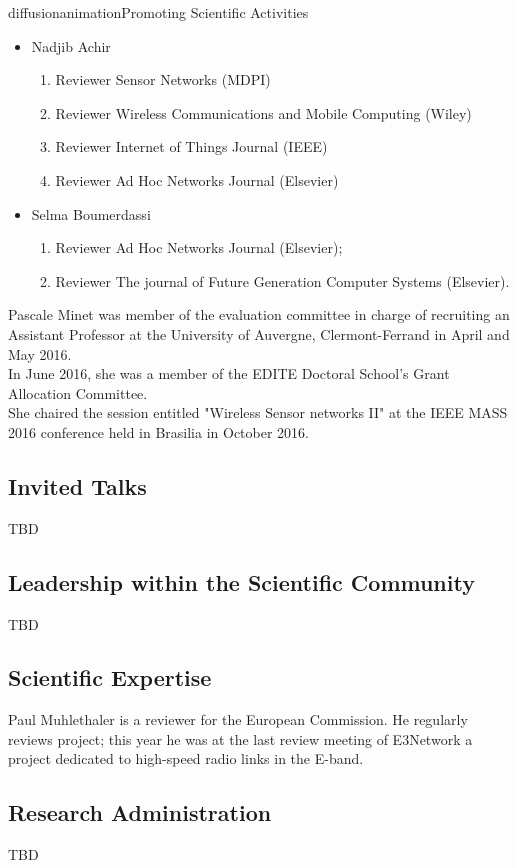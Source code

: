 \documentclass{ra2016}
\begin{document}
\begin{module}{diffusion}{animation}{Promoting Scientific Activities}
\begin{itemize}
\begin{enumerate}
        \end{enumerate}
    \item Nadjib Achir
        \begin{enumerate}
            \item Reviewer Sensor Networks (MDPI)
            \item Reviewer Wireless Communications and Mobile Computing (Wiley)
            \item Reviewer Internet of Things Journal (IEEE)
            \item Reviewer Ad Hoc Networks Journal (Elsevier)
        \end{enumerate}
     \item Selma Boumerdassi
				\begin{enumerate}
					\item Reviewer Ad Hoc Networks Journal (Elsevier);
					\item Reviewer The journal of Future Generation Computer Systems (Elsevier).
				\end{enumerate}
\end{itemize}

Pascale Minet was member of the evaluation committee in charge of recruiting an Assistant Professor at the University of Auvergne, Clermont-Ferrand in April and May 2016.\\
In June 2016, she was a member of the EDITE Doctoral School's Grant Allocation Committee.\\
She chaired the session entitled "Wireless Sensor networks II" at the IEEE MASS 2016 conference held in Brasilia in October 2016.\\ 

\subsection{Invited Talks}

TBD
\subsection{Leadership within the Scientific Community}
TBD

\subsection{Scientific Expertise}

Paul Muhlethaler is a reviewer for the European Commission. He regularly reviews 
project; this year he was at the last review meeting of E3Network a project dedicated 
to high-speed radio links in the E-band. 

\subsection{Research Administration}
 
 TBD
 
\end{module}
\end{document}
